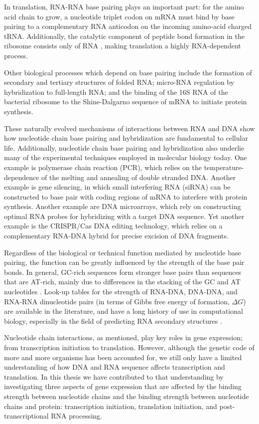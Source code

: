 In translation, RNA-RNA base pairing plays an important part: for the amino
acid chain to grow, a nucleotide triplet codon on mRNA must bind by base
pairing to a complementary RNA anticodon on the incoming amino-acid charged
tRNA. Additionally, the catalytic component of peptide bond formation in the
ribosome consists only of RNA \cite{steitz_rna_2003}, making translation a
highly RNA-dependent process.

Other biological processes which depend on base pairing include the formation
of secondary and tertiary structures of folded RNA; micro-RNA regulation by
hybridization to full-length RNA; and the binding of the 16S RNA of the
bacterial ribosome to the Shine-Dalgarno sequence of mRNA to
initiate protein synthesis.

These naturally evolved mechanisms of interactions between RNA and DNA show how
nucleotide chain base pairing and hybridization are fundamental to cellular
life. Additionally, nucleotide chain base pairing and hybridization also
underlie many of the experimental techniques employed in molecular biology
today. One example is polymerase chain reaction (PCR), which relies on the
temperature-dependence of the melting and annealing of double stranded DNA.
Another example is gene silencing, in which small interfering RNA (siRNA) can
be constructed to base pair with coding regions of mRNA to interfere with
protein synthesis. Another example are DNA microarrays, which rely on
constructing optimal RNA probes for hybridizing with a target DNA sequence.
Yet another example is the CRISPR/Cas DNA editing technology, which relies on
a complementary RNA-DNA hybrid for precise excision of DNA fragments.

Regardless of the biological or technical function mediated by nucleotide base
pairing, the function can be greatly influenced by the strength of the base
pair bonds. In general, GC-rich sequences form stronger base pairs than
sequences that are AT-rich, mainly due to differences in the stacking of the
GC and AT nucleotides \cite{yakovchuk_base-stacking_2006}. Look-up tables for
the strength of RNA-DNA, DNA-DNA, and RNA-RNA dinucleotide pairs (in terms of
Gibbs free energy of formation, $\Delta G$) are available in the literature,
and have a long history of use in computational biology, especially in the
field of predicting RNA secondary structures \cite{mathews_prediction_2006}. 

Nucleotide chain interactions, as mentioned, play key roles in gene expression;
from transcription initiation to translation. However, although the genetic
code of more and more organisms has been accounted for, we still only have a
limited understanding of how DNA and RNA sequence affects transcription and
translation. In this thesis we have contributed to that understanding by
investigating three aspects of gene expression that are affected by the binding
strength between nucleotide chains and the binding strength between nucleotide
chains and protein: transcription initiation, translation initiation, and
post-transcriptional RNA processing.

